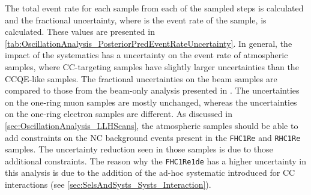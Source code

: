 The total event rate for each sample from each of the sampled steps is calculated and the fractional uncertainty,  where  is the event rate of the  sample, is calculated. These values are presented in \autoref{tab:OscillationAnalysis_PosteriorPredEventRateUncertainty}. In general, the impact of the systematics has a  uncertainty on the event rate of atmospheric samples, where CC\quickmath{1\pi}-targeting samples have slightly larger uncertainties than the CCQE-like samples.
The fractional uncertainties on the beam samples are compared to those from the beam-only analysis presented in \cite{Dunne2020-uf, t2k_tn_393}. The uncertainties on the one-ring muon samples are mostly unchanged, whereas the uncertainties on the one-ring electron samples are different. As discussed in \autoref{sec:OscillationAnalysis_LLHScans}, the atmospheric samples should be able to add constraints on the NC background events present in the \texttt{FHC1Re} and \texttt{RHC1Re} samples. The uncertainty reduction seen in those samples is due to those additional constraints. The reason why the \texttt{FHC1Re1de} has a higher uncertainty in this analysis is due to the addition of the ad-hoc systematic introduced for CC\quickmath{1\pi} interactions (see \autoref{sec:SelsAndSysts_Systs_Interaction}).

